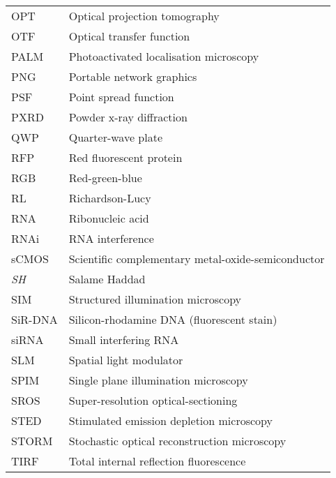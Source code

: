 \begin{flushleft}
\begin{longtable}[l]{|p{5.5em}|p{25em}|}
OPT        & Optical projection tomography                              \\
OTF        & Optical transfer function                                  \\
PALM       & Photoactivated localisation microscopy                     \\
PNG        & Portable network graphics                                  \\
PSF        & Point spread function                                      \\
PXRD       & Powder x-ray diffraction                                   \\
QWP        & Quarter-wave plate                                         \\
RFP        & Red fluorescent protein                                    \\
RGB        & Red-green-blue                                             \\
RL         & Richardson-Lucy                                            \\
RNA        & Ribonucleic acid                                           \\
RNAi       & RNA interference                                           \\
sCMOS      & Scientific complementary metal-oxide-semiconductor         \\
\textit{SH} & Salame Haddad                                              \\
SIM        & Structured illumination microscopy                         \\
SiR-DNA    & Silicon-rhodamine DNA (fluorescent stain)                  \\
siRNA      & Small interfering RNA                                      \\
SLM        & Spatial light modulator                                    \\
SPIM       & Single plane illumination microscopy                       \\
SROS       & Super-resolution optical-sectioning                        \\
STED       & Stimulated emission depletion microscopy                   \\
STORM      & Stochastic optical reconstruction microscopy              \\
TIRF       & Total internal reflection fluorescence                     \\

\end{longtable}
\end{flushleft}
